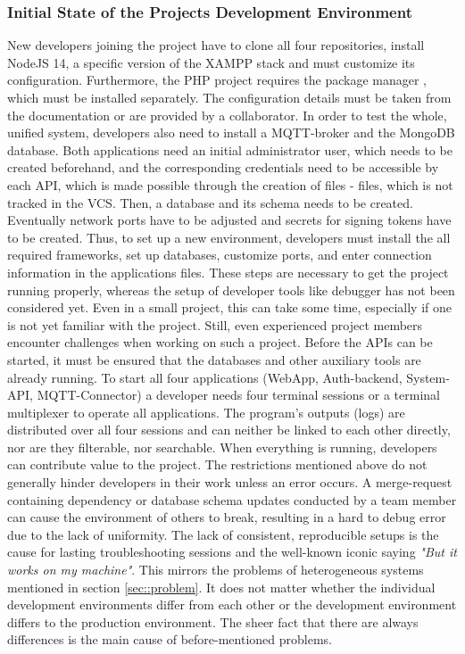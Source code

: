         \subsubsection{Initial State of the Projects Development Environment}
        New developers joining the project have to clone all four repositories, install NodeJS 14, a specific version of the \ac{XAMPP} stack and must customize its configuration. Furthermore, the PHP project requires the package manager , which must be installed separately. The configuration details must be taken from the documentation or are provided by a collaborator. In order to test the whole, unified system, developers also need to install a MQTT-broker and the MongoDB database. Both applications need an initial administrator user, which needs to be created beforehand, and the corresponding credentials need to be accessible by each \ac{API}, which is made possible through the creation of  files - files, which is not tracked in the \ac{VCS}. Then, a database and its schema needs to be created. Eventually network ports have to be adjusted and secrets for signing tokens have to be created.
        Thus, to set up a new environment, developers must install the all required frameworks, set up databases, customize ports, and enter connection information in the applications  files. These steps are necessary to get the project running properly, whereas the setup of developer tools like debugger has not been considered yet. Even in a small project, this can take some time, especially if one is not yet familiar with the project.\newpage
        \noindent Still, even experienced project members encounter challenges when working on such a project. Before the \ac{API}s can be started, it must be ensured that the databases and other auxiliary tools are already running. To start all four applications (WebApp, Auth-backend, System-API, MQTT-Connector) a developer needs four terminal sessions or a terminal multiplexer to operate all applications. The program's outputs (logs) are distributed over all four sessions and can neither be linked to each other directly, nor are they filterable, nor searchable. When everything is running, developers can contribute value to the project. The restrictions mentioned above do not generally hinder developers in their work unless an error occurs. A merge-request containing dependency or database schema updates conducted by a team member can cause the environment of others to break, resulting in a hard to debug error due to the lack of uniformity. The lack of consistent, reproducible setups is the cause for lasting troubleshooting sessions and the well-known iconic saying \textit{"But it works on my machine"}. This mirrors the problems of heterogeneous systems mentioned in section \ref{sec::problem}. It does not matter whether the individual development environments differ from each other or the development environment differs to the production environment. The sheer fact that there are always differences is the main cause of before-mentioned problems. \newline
